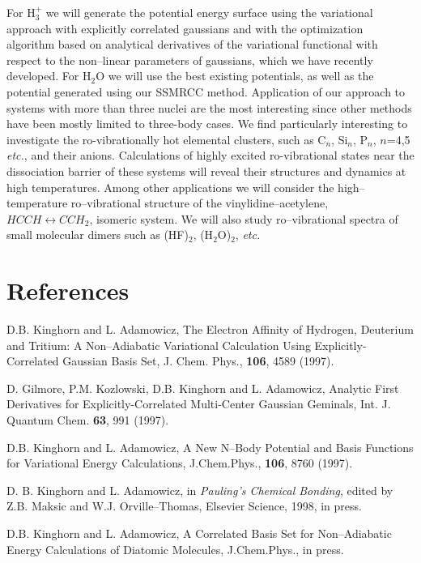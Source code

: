 For H$_3^+$ we will generate the
potential energy surface using
the variational approach with explicitly correlated
gaussians and with the optimization algorithm based
on analytical derivatives of the variational functional
with respect to the non--linear parameters of gaussians,
which we have recently developed.
For H$_2$O we will use the best existing potentials,
as well as the potential generated using our SSMRCC method.
Application of our approach to systems with more than three
nuclei are the most interesting since
other methods have been mostly limited to three-body cases.
We find particularly interesting
to investigate
the
ro-vibrationally hot elemental clusters, such as
C$_n$, Si$_n$, P$_n$, $n$=4,5 {\it etc.}, and their anions.
Calculations of highly excited ro-vibrational states near the
dissociation barrier of
these systems will reveal their structures and dynamics
at high temperatures.
Among other applications we will consider
the high--temperature
ro--vibrational structure
of the vinylidine--acetylene,
$HCCH \leftrightarrow CCH_2$, isomeric system.
We will also study
ro--vibrational spectra
of small molecular dimers such
as (HF)$_2$, (H$_2$O)$_2$, {\it etc.}


\newpage

\section{References}

\begin{thebibliography}{999}


D.B. Kinghorn and L. Adamowicz,
The Electron Affinity of Hydrogen, Deuterium and Tritium:
A Non--Adiabatic Variational Calculation Using Explicitly-Correlated
Gaussian Basis Set, J. Chem. Phys.,
{\bf 106}, 4589 (1997).



D. Gilmore, P.M. Kozlowski, D.B. Kinghorn and
L. Adamowicz, Analytic First Derivatives for
Explicitly-Correlated Multi-Center Gaussian Geminals,
Int. J. Quantum Chem. {\bf 63}, 991 (1997).


D.B. Kinghorn and L. Adamowicz,
A New N--Body Potential and Basis Functions for
Variational Energy Calculations,
J.Chem.Phys., {\bf 106}, 8760 (1997).

D. B. Kinghorn and L. Adamowicz, in {\em Pauling's Chemical
Bonding}, edited by Z.B. Maksic and W.J. Orville--Thomas,
Elsevier Science, 1998, in press.

D.B. Kinghorn and L. Adamowicz,
A Correlated Basis Set for Non--Adiabatic Energy
Calculations of Diatomic Molecules,
J.Chem.Phys., in press.




\end{thebibliography}


